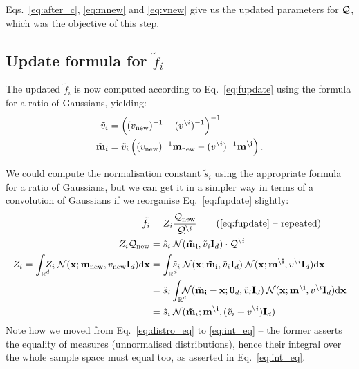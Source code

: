 \documentclass[11pt]{article}
\begin{document}
Eqs.~\eqref{eq:after_c}, \eqref{eq:mnew} and \eqref{eq:vnew} give us the 
updated parameters for $\mathcal{Q}$, which was the objective of this 
step.

\subsection*{Update formula for $\tilde{f}_i$}
The updated $\tilde{f}_i$ is now computed according to 
Eq.~\eqref{eq:fupdate} using the formula for a ratio of Gaussians, 
yielding:
\begin{align}
	\tilde{v}_i &= \left( (v_{\text{new}})^{-1} - (v^{\setminus 
	i})^{-1}\right)^{-1} \\
	\mathbf{\tilde{m}}_i &= \tilde{v}_i \left( (v_{\text{new}})^{-1}\mathbf{m_{\text{new}}}
																			- (v^{\setminus i})^{-1}\mathbf{m^{\setminus i}}\right).
\end{align}

We could compute the normalisation constant $\tilde{s}_i$ using the 
appropriate formula for a ratio of Gaussians, but we can get it in 
a simpler way in terms of a convolution of Gaussians if we reorganise 
Eq.~\eqref{eq:fupdate} slightly:
\begin{align}
	\tilde{f}_i &= Z_i\frac{\kve_{\text{new}}}{\kve^{\setminus i}}
		\tag{\ref{eq:fupdate} -- repeated} \\
	Z_i \kve_{\text{new}} &= \tilde{s}_i \norm(\vek{\tilde{m}_i}, \tilde{v}_i\unity_d)
																		\cdot \kve^{\setminus i}
	\label{eq:distro_eq} \\
	Z_i = \intrc Z_i \norm(\vek{x}; \vek{m_{\text{new}}}, v_{\text{new}}\unity_d) \byd\vek{x}
	   &= \intrc \tilde{s}_i \norm(\vek{x}; \vek{\tilde{m}_i}, \tilde{v}_i\unity_d)
		 											\norm(\vek{x}; \vek{m^{\setminus i}}, v^{\setminus i}\unity_d)
				\byd\vek{x}
				\label{eq:int_eq} \\
		 &= \tilde{s}_i \intrcc \norm(\vek{\tilde{m}_i} - \vek{x}; \vek{0}_d, 
							\tilde{v}_i\unity_d)
							\norm(\vek{x}; \vek{m^{\setminus i}}, v^{\setminus i}\unity_d)
				\byd\vek{x} \\
		 &= \tilde{s}_i \norm(\vek{\tilde{m}}_i;
							\vek{m^{\setminus i}}, (\tilde{v}_i + v^{\setminus i})\unity_d)
			\label{eq:si_rhs}
\end{align}
Note how we moved from Eq.~\eqref{eq:distro_eq} to \eqref{eq:int_eq} -- the 
former asserts the equality of measures (unnormalised distributions), hence 
their integral over the whole sample space must equal too, as asserted in 
Eq.~\eqref{eq:int_eq}.
\end{document}
